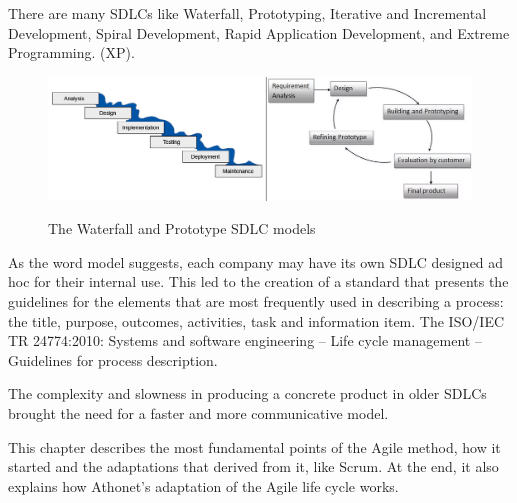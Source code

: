 There are many SDLCs like Waterfall, Prototyping, Iterative and Incremental Development, Spiral Development, Rapid Application Development, and Extreme Programming. (XP). 

\begin{figure}[H]
	\centering
	\includegraphics[width=\textwidth]{resources/warterfall_prototype}\\
	\caption{The Waterfall and Prototype SDLC models}
\end{figure}

As the word model suggests, each company may have its own SDLC designed ad hoc for their internal use.
This led to the creation of a standard that presents the guidelines for the elements that are most frequently used in describing a process: the title, purpose, outcomes, activities, task and information item.
The ISO/IEC TR 24774:2010: Systems and software engineering -- Life cycle management -- Guidelines for process description. %

The complexity and slowness in producing a concrete product in older SDLCs brought the need for a faster and more communicative model.


This chapter describes the most fundamental points of the Agile method, how it started and the adaptations that derived from it, like Scrum.
At the end, it also explains how Athonet's adaptation of the Agile life cycle works.


